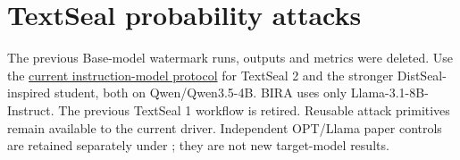 \section{TextSeal probability
attacks}\label{record-docs-textseal-api-attacks-md-textseal-probability-attacks}

The previous Base-model watermark runs, outputs and metrics were
deleted. Use the \href{records/docs/instruct_watermarking.tex}{current
instruction-model protocol} for TextSeal 2 and the stronger
DistSeal-inspired student, both on Qwen/Qwen3.5-4B. BIRA uses only
Llama-3.1-8B-Instruct. The previous TextSeal 1 workflow is retired.
Reusable attack primitives remain available to the current driver.
Independent OPT/Llama paper controls are retained separately under
\texttt{};
they are not new target-model results.
